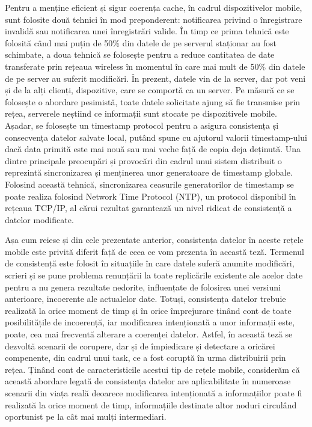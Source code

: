 \documentclass[12pt,a4paper]{report}
\begin{document}
Pentru a menține eficient și sigur coerența cache\cite{knaesel2009high}, în cadrul dispozitivelor mobile, sunt folosite două tehnici în mod preponderent: notificarea privind o înregistrare invalidă sau notificarea unei înregistrări valide. În timp ce prima tehnică este folosită când mai puțin de 50\% din datele de pe serverul staționar au fost schimbate, a doua tehnică se folosește pentru a reduce cantitatea de date transferate prin rețeaua wireless în momentul în care mai mult de 50\% din datele de pe server au suferit modificări. În prezent, datele vin de la server, dar pot veni și de la alți clienți, dispozitive, care se comportă ca un server. Pe măsură ce se folosește o abordare pesimistă, toate datele solicitate ajung să fie transmise prin rețea, serverele neștiind ce informații sunt stocate pe dispozitivele mobile. Așadar, se folosește un timestamp protocol pentru a asigura consistența și consecvența datelor salvate local, putând spune cu ajutorul valorii timestamp-ului dacă data primită este mai nouă sau mai veche față de copia deja deținută. Una dintre principale preocupări și provocări din cadrul unui sistem distribuit o reprezintă sincronizarea și menținerea unor generatoare de timestamp globale. Folosind această tehnică, sincronizarea ceasurile generatorilor de timestamp se poate realiza folosind Network Time Protocol (NTP), un protocol disponibil în rețeaua TCP/IP, al cărui rezultat garantează un nivel ridicat de consistență a datelor modificate.

Așa cum reiese și din cele prezentate anterior, consistența datelor în aceste rețele mobile este privită diferit față de ceea ce vom prezenta în această teză. Termenul de consistență este folosit în situațiile în care datele suferă anumite modificări, scrieri și se pune problema renunțării la toate replicările existente ale acelor date pentru a nu genera rezultate nedorite, influențate de folosirea unei versiuni anterioare, incoerente ale actualelor date. Totuși, consistența datelor trebuie realizată la orice moment de timp și în orice împrejurare ținând cont de toate posibilitățile de incoerență, iar modificarea intenționată a unor informații este, poate, cea mai frecventă alterare a coerenței datelor. Astfel, în această teză se dezvoltă scenarii de corupere, dar și de împiedicare și detectare a oricărei compenente, din cadrul unui task, ce a fost coruptă în urma distribuirii prin rețea. Ținând cont de caracteristicile acestui tip de rețele mobile, considerăm că această abordare legată de consistența datelor are aplicabilitate în numeroase scenarii din viața reală deoarece modificarea intenționată a informațiilor poate fi realizată la orice moment de timp, informațiile destinate altor noduri circulând oportunist pe la cât mai mulți intermediari.
\end{document}
